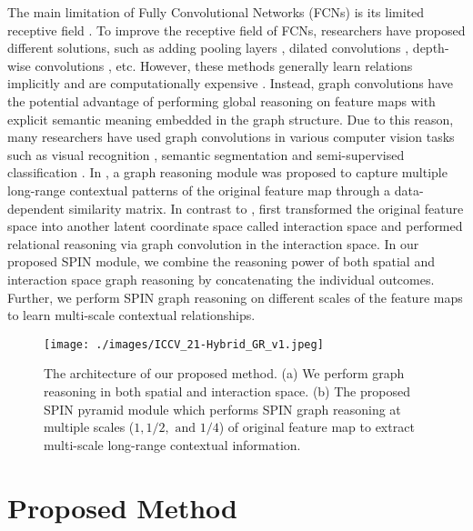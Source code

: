 \documentclass[letterpaper, 10 pt, conference]{ieeeconf}
\begin{document}
  The main limitation of Fully Convolutional Networks (FCNs) is its limited receptive field \cite{araujo2019computing}. To improve the receptive field of FCNs, researchers have proposed different solutions, such as adding pooling layers \cite{araujo2019computing}, dilated convolutions \cite{yu2015multi}, depth-wise convolutions \cite {howard2017mobilenets}, etc. However, these methods generally learn relations implicitly and are computationally expensive \cite{li2020spatial}. Instead, graph convolutions have the potential advantage of performing global reasoning on feature maps with explicit semantic meaning embedded in the graph structure. Due to this reason, many researchers have used graph convolutions in various computer vision tasks such as visual recognition \cite{li2018beyond, liang2018symbolic}, semantic segmentation \cite{chen2019graph, li2020spatial, li2019global} and  semi-supervised classification \cite{kipf2016semi}. In \cite{li2020spatial}, a graph reasoning module was proposed to capture multiple long-range contextual patterns of the original feature map through a data-dependent similarity matrix. In contrast to \cite{li2020spatial}, \cite{chen2019graph}  first  transformed  the original feature space into another latent coordinate space called interaction space and performed relational reasoning via graph convolution in the interaction space. In our proposed SPIN module, we combine the reasoning power of both spatial and interaction space graph reasoning by concatenating the individual outcomes. Further, we perform SPIN graph reasoning on different scales of the feature maps to learn multi-scale contextual relationships. 


\begin{figure}[tb!]
	\centering
	\texttt{[image: ./images/ICCV\_21-Hybrid\_GR\_v1.jpeg]}
    \vskip-10pt
    \caption{The architecture of our proposed method. (a) We perform graph reasoning in both spatial and interaction space. (b) The proposed SPIN pyramid module which performs SPIN graph reasoning at multiple scales ($1, 1/2, \text{ and } 1/4$) of original feature map to extract multi-scale long-range contextual information.
	\vspace{-5mm}
	}
	\label{SPIN}
\end{figure}
\section{Proposed Method}
\end{document}
